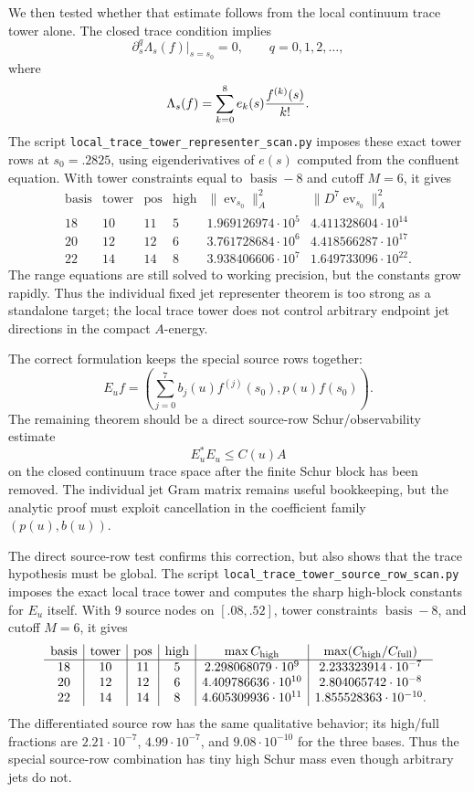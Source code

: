\documentclass[11pt]{article}
\begin{document}
We then tested whether that estimate follows from the local continuum trace
tower alone.  The closed trace condition implies
\[
  \partial_s^q\Lambda_s(f)\big|_{s=s_0}=0,\qquad q=0,1,2,\ldots ,
\]
where
\[
  \Lambda_s(f)=\sum_{k=0}^8 e_k(s){f^{(k)}(s)\over k!}.
\]
The script \texttt{local\_trace\_tower\_representer\_scan.py} imposes these
exact tower rows at \(s_0=.2825\), using eigenderivatives of \(e(s)\) computed
from the confluent equation.  With tower constraints equal to
\(\operatorname{basis}-8\) and cutoff \(M=6\), it gives
\[
\begin{array}{c|c|c|c|c|c}
\operatorname{basis}&\operatorname{tower}&\operatorname{pos}&
\operatorname{high}&\|\operatorname{ev}_{s_0}\|_A^2&
\|D^7\operatorname{ev}_{s_0}\|_A^2\\\hline
18&10&11&5&1.969126974\cdot10^5&4.411328604\cdot10^{14}\\
20&12&12&6&3.761728684\cdot10^6&4.418566287\cdot10^{17}\\
22&14&14&8&3.938406606\cdot10^7&1.649733096\cdot10^{22}.
\end{array}
\]
The range equations are still solved to working precision, but the constants
grow rapidly.  Thus the individual fixed jet representer theorem is too
strong as a standalone target; the local trace tower does not control
arbitrary endpoint jet directions in the compact \(A\)-energy.

The correct formulation keeps the special source rows together:
\[
  E_u f=
  \left(
    \sum_{j=0}^7 b_j(u)f^{(j)}(s_0),
    p(u)f(s_0)
  \right).
\]
The remaining theorem should be a direct source-row Schur/observability
estimate
\[
  E_u^\ast E_u\le C(u)A
\]
on the closed continuum trace space after the finite Schur block has been
removed.  The individual jet Gram matrix remains useful bookkeeping, but the
analytic proof must exploit cancellation in the coefficient family
\((p(u),b(u))\).

The direct source-row test confirms this correction, but also shows that the
trace hypothesis must be global.  The script
\texttt{local\_trace\_tower\_source\_row\_scan.py} imposes the exact local
trace tower and computes the sharp high-block constants for \(E_u\) itself.
With 9 source nodes on \([.08,.52]\), tower constraints
\(\operatorname{basis}-8\), and cutoff \(M=6\), it gives
\[
\begin{array}{c|c|c|c|c|c}
\operatorname{basis}&\operatorname{tower}&\operatorname{pos}&
\operatorname{high}&\max C_{\rm high}&
\max(C_{\rm high}/C_{\rm full})\\\hline
18&10&11&5&2.298068079\cdot10^9&2.233323914\cdot10^{-7}\\
20&12&12&6&4.409786636\cdot10^{10}&2.804065742\cdot10^{-8}\\
22&14&14&8&4.605309936\cdot10^{11}&1.855528363\cdot10^{-10}.
\end{array}
\]
The differentiated source row has the same qualitative behavior; its
high/full fractions are \(2.21\cdot10^{-7}\), \(4.99\cdot10^{-7}\), and
\(9.08\cdot10^{-10}\) for the three bases.  Thus the special source-row
combination has tiny high Schur mass even though arbitrary jets do not.
\end{document}

